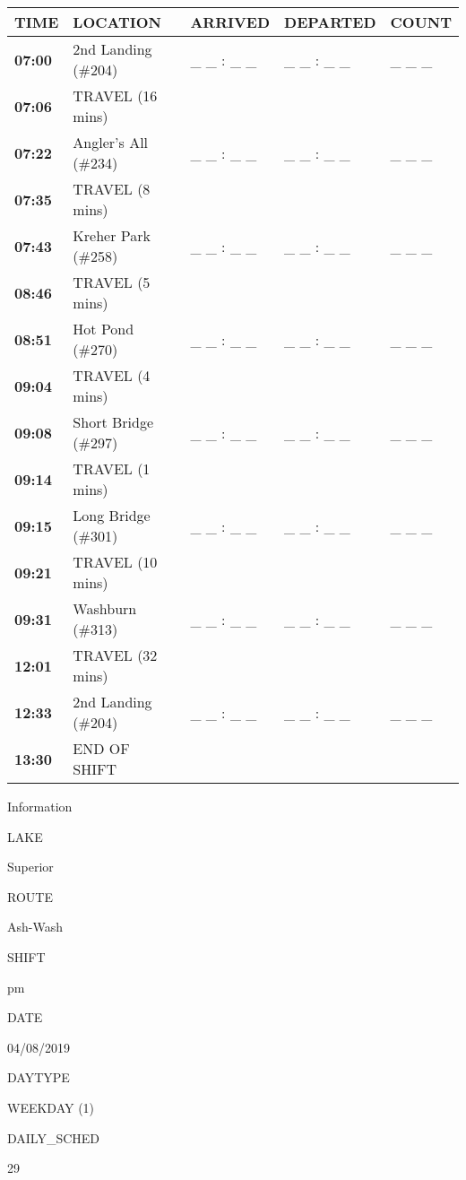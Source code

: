 \documentclass[]{article}
\begin{document}
\begin{tabular}{>{\bfseries}lllll}
\toprule
\textbf{TIME} & \textbf{LOCATION} & \textbf{ARRIVED} & \textbf{DEPARTED} & \textbf{COUNT}\\
\midrule
07:00 & 2nd Landing (\#204) & \_ \_ : \_ \_ & \_ \_ : \_ \_ & \_ \_ \_\\
07:06 & TRAVEL (16 mins) &  &  & \\
07:22 & Angler's All (\#234) & \_ \_ : \_ \_ & \_ \_ : \_ \_ & \_ \_ \_\\
07:35 & TRAVEL (8 mins) &  &  & \\
07:43 & Kreher Park (\#258) & \_ \_ : \_ \_ & \_ \_ : \_ \_ & \_ \_ \_\\
08:46 & TRAVEL (5 mins) &  &  & \\
08:51 & Hot Pond (\#270) & \_ \_ : \_ \_ & \_ \_ : \_ \_ & \_ \_ \_\\
09:04 & TRAVEL (4 mins) &  &  & \\
09:08 & Short Bridge (\#297) & \_ \_ : \_ \_ & \_ \_ : \_ \_ & \_ \_ \_\\
09:14 & TRAVEL (1 mins) &  &  & \\
09:15 & Long Bridge (\#301) & \_ \_ : \_ \_ & \_ \_ : \_ \_ & \_ \_ \_\\
09:21 & TRAVEL (10 mins) &  &  & \\
09:31 & Washburn (\#313) & \_ \_ : \_ \_ & \_ \_ : \_ \_ & \_ \_ \_\\
12:01 & TRAVEL (32 mins) &  &  & \\
12:33 & 2nd Landing (\#204) & \_ \_ : \_ \_ & \_ \_ : \_ \_ & \_ \_ \_\\
13:30 & END OF SHIFT &  &  & \\
\bottomrule
\end{tabular}\newpage

Information

LAKE

Superior

ROUTE

Ash-Wash

SHIFT

pm

DATE

04/08/2019

DAYTYPE

WEEKDAY (1)

DAILY\_SCHED

29

\vspace{24pt}
\end{document}
